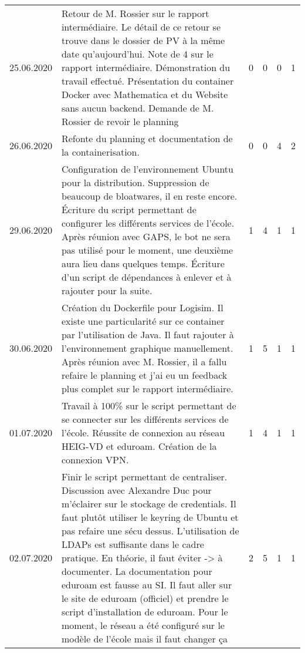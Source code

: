 \begin{landscape}
\begin{longtable}[c]{lp{10cm}rrrr}
	25.06.2020
	& Retour de M. Rossier sur le rapport intermédiaire. Le détail de ce retour se trouve dans le dossier de PV  à la même date qu'aujourd'hui. Note de 4 sur le rapport intermédiaire. Démonstration du travail effectué. Présentation du container Docker avec Mathematica et du Website sans aucun backend. Demande de M. Rossier de revoir le planning
	& 0 %
	& 0 %
	& 0 %
	& 1\\ %
	
	26.06.2020
	& Refonte du planning et documentation de la containerisation.
	& 0 %
	& 0 %
	& 4 %
	& 2\\ %
	
	29.06.2020
	& Configuration de l'environnement Ubuntu pour la distribution. Suppression de beaucoup de bloatwares, il en reste encore. Écriture du script permettant de configurer les différents services de l'école. Après réunion avec GAPS, le bot ne sera pas utilisé pour le moment, une deuxième aura lieu dans quelques temps. Écriture d'un script de dépendances à enlever et à rajouter pour la suite.
	& 1 %
	& 4 %
	& 1 %
	& 1\\ %
	
	30.06.2020
	& Création du Dockerfile pour Logisim. Il existe une particularité sur ce container par l'utilisation de Java. Il faut rajouter \com{docker} à l'environnement graphique \com{xhost} manuellement. Après réunion avec M. Rossier, il a fallu refaire le planning et j'ai eu un feedback plus complet sur le rapport intermédiaire.
	& 1 %
	& 5 %
	& 1 %
	& 1\\ %
	
	01.07.2020
	& Travail à 100\% sur le script permettant de se connecter sur les différents services de l'école. Réussite de connexion au réseau HEIG-VD et eduroam. Création de la connexion VPN.
	& 1 %
	& 4 %
	& 1 %
	& 1\\ %
	
	02.07.2020
	& Finir le script permettant de centraliser. Discussion avec Alexandre Duc pour m'éclairer sur le stockage de credentials. Il faut plutôt utiliser le keyring de Ubuntu et pas refaire une sécu dessus. L'utilisation de LDAPs est suffisante dans le cadre pratique. En théorie, il faut éviter -> à documenter. La documentation pour eduroam est fausse au SI. Il faut aller sur le site de eduroam (officiel) et prendre le script d'installation de eduroam. Pour le moment, le réseau a été configuré sur le modèle de l'école mais il faut changer ça 
	& 2 %
	& 5 %
	& 1 %
	& 1\\ %
	

\end{longtable}
\end{landscape}
